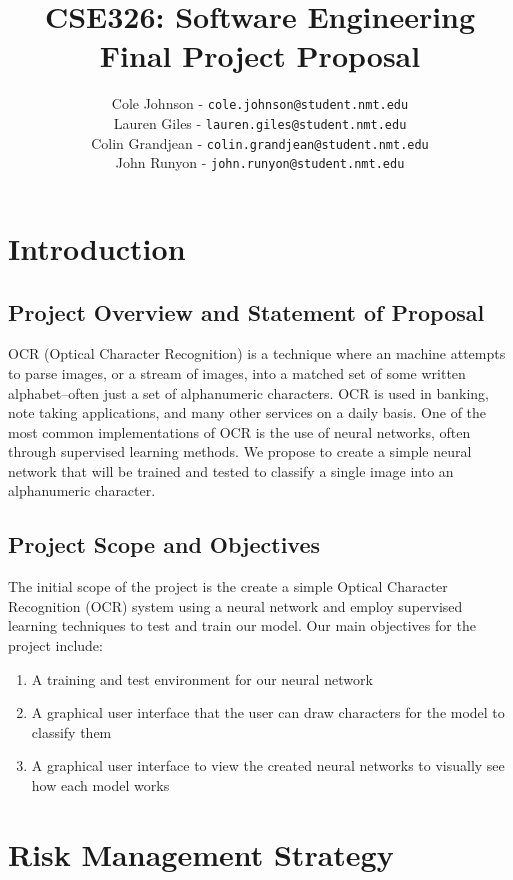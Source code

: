 \documentclass[english,12pt]{article}
\author{
        Cole Johnson - \texttt{cole.johnson@student.nmt.edu} \\
        Lauren Giles - \texttt{lauren.giles@student.nmt.edu} \\
        Colin Grandjean - \texttt{colin.grandjean@student.nmt.edu} \\
        John Runyon  - \texttt{john.runyon@student.nmt.edu}
}
\title{ \textbf{CSE326: Software Engineering} \\
        Final Project Proposal
}
\begin{document}
\maketitle
\tableofcontents
\section{Introduction}

\subsection{Project Overview and Statement of Proposal}
OCR (Optical Character Recognition) is a technique where an machine attempts
to parse images, or a stream of images, into a matched set of some written
alphabet--often just a set of alphanumeric characters. OCR is used in banking,
note taking applications, and many other services on a daily basis.
One of the most common implementations of OCR is the use of neural networks,
often through supervised learning methods. We propose to create a simple neural
network that will be trained and tested to classify a single image into an
alphanumeric character.

\subsection{Project Scope and Objectives}
The initial scope of the project is the create a simple Optical Character Recognition (OCR)
system using a neural network and employ supervised learning techniques to test and train our
model. Our main objectives for the project include:
\begin{enumerate}[(a.)]
  \item A training and test environment for our neural network
  \item A graphical user interface that the user can draw characters
    for the model to classify them
  \item A graphical user interface to view the created neural networks to
    visually see how each model works
\end{enumerate}

\section{Risk Management Strategy}
\end{document}
